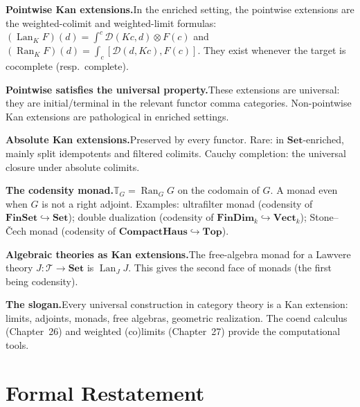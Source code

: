 \begin{summarybox}
\textbf{Pointwise Kan extensions.}\quad In the enriched setting, the
pointwise extensions are the weighted-colimit and weighted-limit formulas:
$(\operatorname{Lan}_K F)(d) = \int^c \mathcal{D}(K c, d) \otimes F(c)$ and
$(\operatorname{Ran}_K F)(d) = \int_c [\mathcal{D}(d, K c), F(c)]$. They
exist whenever the target is cocomplete (resp.\ complete).

\textbf{Pointwise satisfies the universal property.}\quad These extensions
are universal: they are initial/terminal in the relevant functor comma
categories. Non-pointwise Kan extensions are pathological in enriched
settings.

\textbf{Absolute Kan extensions.}\quad Preserved by every functor. Rare:
in $\mathbf{Set}$-enriched, mainly split idempotents and filtered colimits.
Cauchy completion: the universal closure under absolute colimits.

\textbf{The codensity monad.}\quad $\mathbb{T}_G = \operatorname{Ran}_G G$
on the codomain of $G$. A monad even when $G$ is not a right adjoint.
Examples: ultrafilter monad (codensity of $\mathbf{FinSet} \hookrightarrow
\mathbf{Set}$); double dualization (codensity of $\mathbf{FinDim}_k
\hookrightarrow \mathbf{Vect}_k$); Stone--\v Cech monad (codensity of
$\mathbf{CompactHaus} \hookrightarrow \mathbf{Top}$).

\textbf{Algebraic theories as Kan extensions.}\quad The free-algebra monad
for a Lawvere theory $J : \mathcal{T} \to \mathbf{Set}$ is $\operatorname{Lan}_J J$.
This gives the second face of monads (the first being codensity).

\textbf{The slogan.}\quad Every universal construction in category theory is
a Kan extension: limits, adjoints, monads, free algebras, geometric
realization. The coend calculus (Chapter~26) and weighted (co)limits
(Chapter~27) provide the computational tools.
\end{summarybox}


\section*{Formal Restatement}

